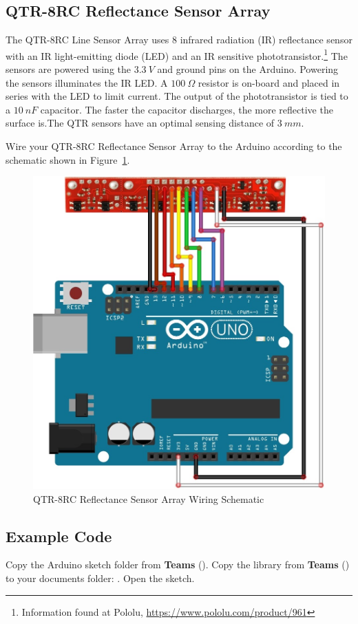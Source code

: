 \documentclass{handout}
\begin{document}
	\subsection{QTR-8RC Reflectance Sensor Array}
	The QTR-8RC Line Sensor Array uses 8 infrared radiation (IR) reflectance sensor with an IR light-emitting diode (LED) and an IR sensitive phototransistor.\footnote{Information found at Pololu, \url{https://www.pololu.com/product/961}} The sensors are powered using the $3.3\ V$ and ground pins on the Arduino. Powering the sensors illuminates the IR LED. A $100\ \Omega$ resistor is on-board and placed in series with the LED to limit current. The output of the phototransistor is tied to a $10\ nF$ capacitor. The faster the capacitor discharges, the more reflective the surface is.\footnotemark[1] The QTR sensors have an optimal sensing distance of $3\ mm$.
	
	Wire your QTR-8RC Reflectance Sensor Array to the Arduino according to the schematic shown in Figure~\ref{Fig Line}.
	
	\begin{figure} [H]
		\centering
		\includegraphics[width=.5\textwidth]{line.jpg}
		\caption{QTR-8RC Reflectance Sensor Array Wiring Schematic}
		\label{Fig Line}
	\end{figure}
	
	\subsection{Example Code}
	Copy the Arduino sketch folder   from \textbf{Teams} (). Copy the  library from \textbf{Teams} () to your documents folder: . Open the  sketch.
	
\end{document}
